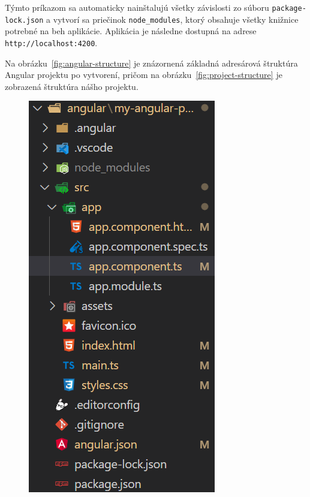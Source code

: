 Týmto príkazom sa automaticky nainštalujú všetky závislosti zo súboru \texttt{package-lock.json} a vytvorí sa priečinok \texttt{node\_modules}, ktorý obsahuje všetky knižnice potrebné na beh aplikácie.
 Aplikácia je následne dostupná na adrese \texttt{http://localhost:4200}.

Na obrázku~\ref{fig:angular-structure} je znázornená základná adresárová štruktúra Angular projektu po vytvorení, pričom na obrázku~\ref{fig:project-structure} je zobrazená štruktúra nášho projektu.

\begin{figure}[H]
  \centering
  \begin{minipage}[t]{0.48\textwidth}
    \centering
    \includegraphics[width=\linewidth]{img/angular-structure.png}

\end{minipage}
\end{figure}
